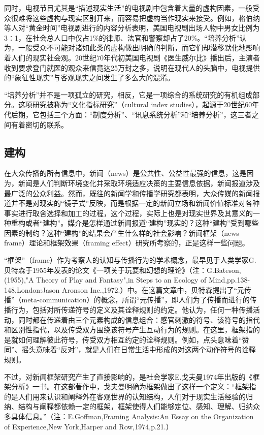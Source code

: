\documentclass[UTF8,12pt]{ctexart}
\numberwithin{equation}{section} %
\numberwithin{figure}{section}
\numberwithin{table}{section}
\begin{document}
	同时，电视节目尤其是“描述现实生活”的电视剧中包含着大量的虚构因素，一般受众很难将这些虚构与现实区别开来，而容易把虚构当作现实来接受。例如，格伯纳等人对“黄金时间”电视剧进行的内容分析表明，美国电视剧出场人物中男女比例为3∶1，在社会总人口中仅占1\%的律师、法官和警察却占了20\%。“培养分析”认为，一般受众不可能对诸如此类的虚构做出明确的判断，而它们却潜移默化地影响着人们的现实社会观。20世纪70年代初美国电视剧《医生威尔比》播出后，主演者收到要求登门就医的观众来信竟达25万封之多，说明在现代人的头脑中，电视提供的“象征性现实”与客观现实之间发生了多么大的混淆。
	
	
	“培养分析”并不是一项孤立的研究，相反，它是一项综合的系统研究的有机组成部分。这项研究被称为“文化指标研究”（cultural index studies），起源于20世纪60年代后期，它包括三个方面：“制度分析”、“讯息系统分析”和“培养分析”，这三者之间有着密切的联系。
	\subsection{建构}
	在大众传播的所有信息中，新闻（news）是公共性、公益性最强的信息，这是因为，新闻是人们判断环境变化并采取环境适应决策的主要信息依据，新闻报道涉及最广泛的公众利益。然而，既往的新闻学和传播学研究都表明，大众传媒的新闻报道并不是对现实的“镜子式”反映，而是根据一定的新闻立场和新闻价值标准对各种事实进行取舍选择和加工的过程，这个过程，实际上也是对现实世界及其意义的一种重构或者“建构”。媒介是怎样通过新闻报道“建构”现实的？这种“建构”受到哪些因素的制约？这种“建构”的结果会产生什么样的社会影响？新闻框架（news frame）理论和框架效果（framing effect）研究所考察的，正是这样一些问题。
	
	“框架”（frame）作为考察人的认知与传播行为的学术概念，最早见于人类学家G.贝特森于1955年发表的论文《一项关于玩耍和幻想的理论》（注：G.Bateson,(1955),"A Theory of Play and Fantasy",in Steps to an Ecology of Mind,pp.138-148,London:Jason Aronson Inc.,1972.）中。在这篇文章中，贝特森提出了“元传播”（meta-communication）的概念，所谓“元传播”，即人们为了传播而进行的传播行为，包括对所传递符号的定义及其诠释规则的约定。他认为，任何一种传播活动，同时都在传递着由三个元素构成的信息组合：感官刺激的符号、该符号的指代和区别性指代，以及传受双方围绕该符号产生互动行为的规则。在这里，框架指的是就如何理解彼此符号，传受双方相互约定的诠释规则。例如，点头意味着“赞同”、摇头意味着“反对”，就是人们在日常生活中形成的对这两个动作符号的诠释规则。
	
	不过，对新闻框架研究产生了直接影响的，是社会学家E.戈夫曼1974年出版的《框架分析》一书。在这部著作中，戈夫曼明确为框架做出了这样一个定义：“框架指的是人们用来认识和阐释外在客观世界的认知结构，人们对于现实生活经验的归纳、结构与阐释都依赖一定的框架，框架使得人们能够定位、感知、理解、归纳众多具体信息。”（注：E.Goffman,Framing Analysis:An Essay on the Organization of Experience,New York,Harper and Row,1974,p.21.）
	
\end{document}

